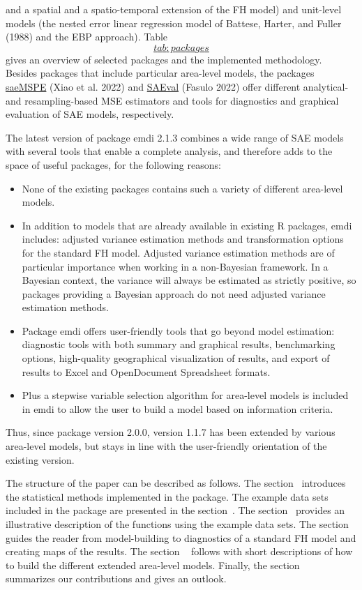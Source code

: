 and a spatial and a spatio-temporal extension of the FH model) and
unit-level models (the nested error linear regression model of
Battese, Harter, and Fuller (1988) and the EBP approach).
Table~\protect\hyperlink{tab:packages}{\[tab:packages\]} gives an overview of selected packages and the
implemented methodology.\\
Besides packages that include particular area-level models, the packages
\href{https://CRAN.R-project.org/package=saeMSPE}{saeMSPE} (Xiao et al. 2022) and
\href{https://CRAN.R-project.org/package=SAEval}{SAEval} (Fasulo 2022) offer
different analytical- and resampling-based MSE estimators and tools for
diagnostics and graphical evaluation of SAE models, respectively.

The latest version of package emdi 2.1.3 combines a wide range of SAE
models with several tools that enable a complete analysis, and therefore
adds to the space of useful packages, for the following reasons:

\begin{itemize}
\item
  None of the existing packages contains such a variety of different
  area-level models.
\item
  In addition to models that are already available in existing R
  packages, emdi includes: adjusted variance estimation methods and
  transformation options for the standard FH model. Adjusted variance
  estimation methods are of particular importance when working in a
  non-Bayesian framework. In a Bayesian context, the variance will
  always be estimated as strictly positive, so packages providing a
  Bayesian approach do not need adjusted variance estimation methods.
\item
  Package emdi offers user-friendly tools that go beyond model
  estimation: diagnostic tools with both summary and graphical
  results, benchmarking options, high-quality geographical
  visualization of results, and export of results to Excel and
  OpenDocument Spreadsheet formats.
\item
  Plus a stepwise variable selection algorithm for area-level models
  is included in emdi to allow the user to build a model based on
  information criteria.
\end{itemize}

Thus, since package version 2.0.0, version 1.1.7 has been extended by
various area-level models, but stays in line with the user-friendly
orientation of the existing version.

The structure of the paper can be described as follows. The section~
introduces the statistical methods implemented in the package. The
example data sets included in the package are presented in the section~.
The section~ provides an illustrative description of the functions using
the example data sets. The section ~ guides the reader from
model-building to diagnostics of a standard FH model and creating maps
of the results. The section ~ follows with short descriptions of how to
build the different extended area-level models. Finally, the section~
summarizes our contributions and gives an outlook.

